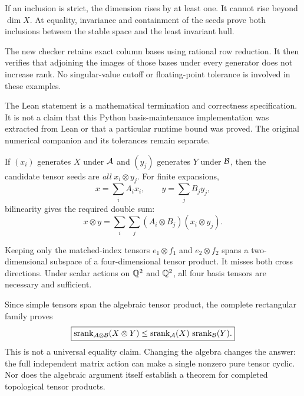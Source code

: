 If an inclusion is strict, the dimension rises by at least one. It cannot rise beyond $\dim X$. At equality, invariance and containment of the seeds prove both inclusions between the stable space and the least invariant hull.

The new checker retains exact column bases using rational row reduction. It then verifies that adjoining the images of those bases under every generator does not increase rank. No singular-value cutoff or floating-point tolerance is involved in these examples.

The Lean statement is a mathematical termination and correctness specification. It is not a claim that this Python basis-maintenance implementation was extracted from Lean or that a particular runtime bound was proved. The original numerical companion and its tolerances remain separate.


If $(x_i)$ generates $X$ under $\AA$ and $(y_j)$ generates $Y$ under $\BB$, then the candidate tensor seeds are \emph{all} $x_i\otimes y_j$. For finite expansions,
\[
x=\sum_i A_ix_i,\qquad y=\sum_j B_jy_j,
\]
bilinearity gives the required double sum:
\[
x\otimes y=\sum_i\sum_j(A_i\otimes B_j)(x_i\otimes y_j).
\]


Keeping only the matched-index tensors $e_1\otimes f_1$ and $e_2\otimes f_2$ spans a two-dimensional subspace of a four-dimensional tensor product. It misses both cross directions. Under scalar actions on $\QQ^2$ and $\QQ^2$, all four basis tensors are necessary and sufficient.

Since simple tensors span the algebraic tensor product, the complete rectangular family proves
\[
\boxed{\srank_{\AA\otimes\BB}(X\otimes Y)
\le\srank_{\AA}(X)\,\srank_{\BB}(Y).}
\]
This is not a universal equality claim. Changing the algebra changes the answer: the full independent matrix action can make a single nonzero pure tensor cyclic. Nor does the algebraic argument itself establish a theorem for completed topological tensor products.

